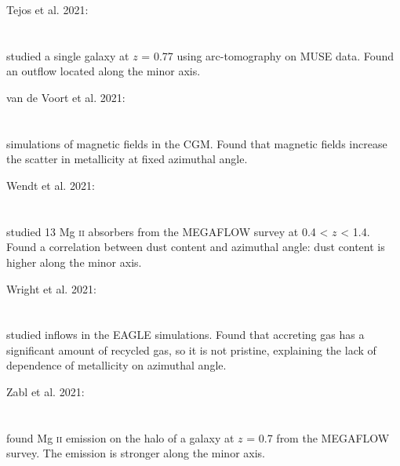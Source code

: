 \hline

Tejos et al. 2021: \\
\citet{2021MNRAS.507..663T} \\
\citep{2021MNRAS.507..663T} \\
studied a single galaxy at $z$ = 0.77 using arc-tomography on MUSE data. Found
an outflow located along the minor axis. \\

\hline

van de Voort et al. 2021: \\
\citet{2021MNRAS.501.4888V} \\
\citep{2021MNRAS.501.4888V} \\
simulations of magnetic fields in the CGM. Found that magnetic fields increase
the scatter in metallicity at fixed azimuthal angle. \\

\hline

Wendt et al. 2021: \\
\citet{2021MNRAS.502.3733W} \\
\citep{2021MNRAS.502.3733W} \\
studied 13 Mg \textsc{ii} absorbers from the MEGAFLOW survey at 0.4 < $z$ < 1.4.
Found a correlation between dust content and azimuthal angle: dust content is
higher along the minor axis. \\

\hline

Wright et al. 2021: \\
\citet{2021MNRAS.504.5702W} \\
\citep{2021MNRAS.504.5702W} \\
studied inflows in the EAGLE simulations. Found that accreting gas has a
significant amount of recycled gas, so it is not pristine, explaining the lack
of dependence of metallicity on azimuthal angle. \\

\hline

Zabl et al. 2021: \\
\citet{2021MNRAS.507.4294Z} \\
\citep{2021MNRAS.507.4294Z} \\
found Mg \textsc{ii} emission on the halo of a galaxy at $z$ = 0.7 from the
MEGAFLOW survey. The emission is stronger along the minor axis. \\
